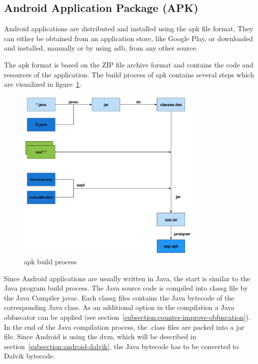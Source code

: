 \subsection{Android Application Package (APK)} \label{subsection:foundation-android-package}
Android applications are distributed and installed using the \gls{apk} file format.
They can either be obtained from an application store, like Google Play, or downloaded and installed, manually or by using \gls{adb}, from any other source.

The \gls{apk} format is based on the ZIP file archive format and contains the code and resources of the application.
The build process of \gls{apk} contains several steps which are visualized in figure~\ref{fig:apk}.
\newline
\begin{figure}[h]
    \centering
    \includegraphics[width=0.8\textwidth]{data/apk.png}
    \caption{\gls{apk} build process \cite{andevconDalvikART}}
    \label{fig:apk}
\end{figure}
Since Android applications are usually written in Java, the start is similar to the Java program build process.
The Java source code is compiled into \gls{classg} file by the Java Compiler javac.
Each \gls{classg} files contains the Java bytecode of the corresponding Java class.
As an additional option in the compilation a Java obfuscator can be applied (see section~\ref{subsection:counter-improve-obfuscation}).
In the end of the Java compilation process, the .class files are packed into a \gls{jar} file.
\newline
Since Android is using the \gls{dvm}, which will be described in section~\ref{subsection:android-dalvik}, the Java bytecode has to be converted to Dalvik bytecode.
